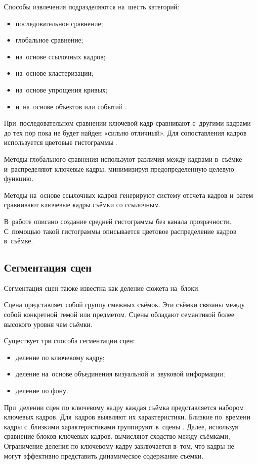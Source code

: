 Способы извлечения подразделяются на~шесть категорий:
\begin{itemize}
    \item последовательное сравнение;
    \item глобальное сравнение;
    \item на~основе ссылочных кадров;
    \item на~основе кластеризации;
    \item на~основе упрощения кривых;
    \item и~на~основе объектов или событий \cite{Truong:2007}.
\end{itemize}

При~последовательном сравнении ключевой кадр сравнивают
с~другими кадрами до тех пор пока не будет найден «сильно отличный».
Для сопоставления кадров используется цветовые гистограммы \cite{Zhang:2003}.

Методы глобального сравнения используют различия между кадрами
в~съёмке и~распределяют ключевые кадры,
минимизируя предопределенную целевую функцию.

Методы на~основе ссылочных кадров генерируют систему отсчета кадров
и~затем сравнивают ключевые кадры съёмки со ссылочным.

В~работе \cite{Kazunori:2006} описано создание средней
гистограммы без канала прозрачности.
С~помощью такой гистограммы описывается цветовое распределение кадров в~съёмке.


\subsection{Сегментация сцен}

Сегментация сцен также известна как деление сюжета на~блоки.

Сцена представляет собой группу смежных съёмок.
Эти съёмки связаны между собой конкретной темой или предметом.
Сцены обладают семантикой более высокого уровня чем съёмки.

Существует три способа сегментации сцен:
\begin{itemize}
    \item деление по ключевому кадру;
    \item деление на~основе объединения визуальной и~звуковой информации;
    \item деление по фону.
\end{itemize}

При~делении сцен по ключевому кадру каждая съёмка представляется набором
ключевых кадров. Для~кадров выявляют их характеристики.
Близкие по~времени кадры с~близкими
характеристиками группируют в~сцены \cite{Truong:2003}.
Далее, используя сравнение блоков ключевых кадров,
вычисляют сходство между съёмками,
Ограничение деления по ключевому кадру заключается в~том, что кадры
не могут эффективно представить динамическое содержание съёмки.

